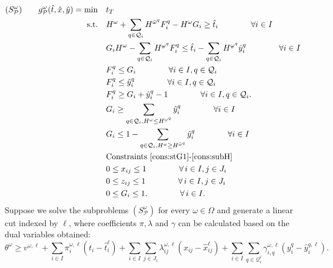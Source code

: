 \documentclass[11pt]{article}
\renewcommand{\underbar}{\underaccent{\bar}}
\begin{document}
	\begin{subequations}
		\label{prob:subTightened}
		\begin{align}
		(S_{\mathcal{P}}^\omega) \qquad g^\omega_{\mathcal{P}}(\hat{t},\hat{x},\hat{y}) = \min \quad & t_T \\
		\text{s.t.} \quad & H^\omega + \sum_{q \in \mathcal{Q}_i} H^{\bar{\omega}^q} F_i^q - H^\omega G_i \geq \hat{t}_i \qquad \qquad \forall i \in I \label{cons:sFG1t}\\
		& G_i H^\omega - \sum_{q \in \mathcal{Q}_i} H^{\underbar{\omega}^q} F_i^q \leq \hat{t}_i - \sum_{q \in \mathcal{Q}_i} H^{\underbar{\omega}^q} \hat{y}_i^q \qquad \qquad \forall i \in I \label{cons:sFG2t}\\
		& F_i^q \leq G_i \qquad \qquad \forall i \in I, q \in \mathcal{Q}_i \label{cons:sFGlin1t}\\
		& F_i^q \leq \hat{y}_i^q \qquad \qquad \forall i \in I, q \in \mathcal{Q}_i \label{cons:sFGlin2t}\\
		& F_i^q \geq G_i + \hat{y}_i^q - 1 \qquad \qquad \forall i \in I, q \in \mathcal{Q}_i. \label{cons:sFGlin3t}\\
		& G_i \geq \sum_{q \in \mathcal{Q}_i, H^\omega \leq H^{\underbar{\omega}^q}} \hat{y}_i^q \qquad \qquad \forall i \in I \label{cons:syG1t}\\
		& G_i \leq 1 - \sum_{q \in \mathcal{Q}_i, H^\omega \geq H^{\bar{\omega}^q}} \hat{y}_i^q \qquad \qquad \forall i \in I \label{cons:syG2t}\\
		& \text{Constraints~\eqref{cons:stG1}-\eqref{cons:subH}}\\
		& 0 \leq x_{ij} \leq 1 \qquad \qquad \forall \,i \in I, j \in J_i\\
		& 0 \leq z_{ij} \leq 1 \qquad \qquad \forall \,i \in I, j \in J_i\\
		& 0 \leq G_i \leq 1. \qquad \qquad \forall \,i \in I. \label{cons:G01t}
		\end{align}
	\end{subequations}
	Suppose we solve the subproblems \((S_{\mathcal{P}}^\omega)\) for every \(\omega \in \Omega\) and generate a linear cut indexed by \(\ell\), where coefficients \(\pi,\lambda\) and \(\gamma\) can be calculated based on the dual variables obtained:
	\begin{equation} \label{cons:cut}
		\theta^\omega \geq v^{\omega,\ell} + \sum_{i \in I} \pi_i^{\omega,\ell} (t_i - \hat{t}_i^{\ell}) + \sum_{i \in I} \sum_{j \in J_i} \lambda_{ij}^{\omega,\ell} (x_{ij} - \hat{x}_{ij}^{\ell}) + \sum_{i \in I} \sum_{q \in \mathcal{Q}^{\ell}_i} \gamma_{i,q}^{\omega,\ell} \left( y_i^{q} - \hat{y}_i^{q,\ell} \right).
	\end{equation}
\end{document}

